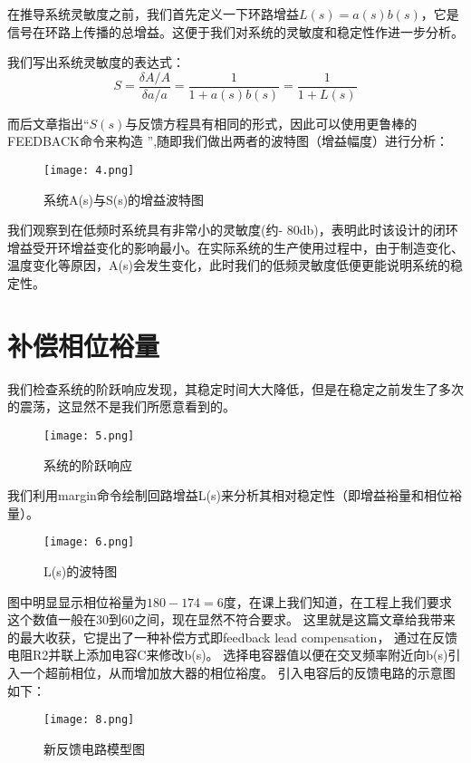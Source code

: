 \documentclass[AutoFakeBold]{LZUThesis}
\begin{document}
在推导系统灵敏度之前，我们首先定义一下环路增益$L(s)=a(s)b(s)$，它是信号在环路上传播的总增益。这便于我们对系统的灵敏度和稳定性作进一步分析。

我们写出系统灵敏度的表达式：
\begin{equation}
    S=\frac{\delta A/A}{\delta a/a}=\frac{1}{1+a(s)b(s)}=\frac{1}{1+L(s)}
\end{equation}

而后文章指出“$S(s)$与反馈方程具有相同的形式，因此可以使用更鲁棒的FEEDBACK命令来构造
”,随即我们做出两者的波特图（增益幅度）进行分析：

\begin{figure}[htbp]
    \centering
    \texttt{[image: 4.png]}
    \caption{系统A(s)与S(s)的增益波特图}
\end{figure}

我们观察到在低频时系统具有非常小的灵敏度(约- 80db)，表明此时该设计的闭环增益受开环增益变化的影响最小。在实际系统的生产使用过程中，由于制造变化、温度变化等原因，A(s)会发生变化，此时我们的低频灵敏度低便更能说明系统的稳定性。

\section{补偿相位裕量}
我们检查系统的阶跃响应发现，其稳定时间大大降低，但是在稳定之前发生了多次的震荡，这显然不是我们所愿意看到的。

\begin{figure}[htbp]
    \centering
    \texttt{[image: 5.png]}
    \caption{系统的阶跃响应}
\end{figure}

我们利用margin命令绘制回路增益L(s)来分析其相对稳定性（即增益裕量和相位裕量）。

\begin{figure}[htbp]
    \centering
    \texttt{[image: 6.png]}
    \caption{L(s)的波特图}
\end{figure}

图中明显显示相位裕量为$180-174=6$度，在课上我们知道，在工程上我们要求这个数值一般在30到60之间，现在显然不符合要求。
这里就是这篇文章给我带来的最大收获，它提出了一种补偿方式即feedback lead compensation，
通过在反馈电阻R2并联上添加电容C来修改b(s)。
选择电容器值以便在交叉频率附近向b(s)引入一个超前相位，从而增加放大器的相位裕度。
引入电容后的反馈电路的示意图如下：
\begin{figure}[htbp]
    \centering
    \texttt{[image: 8.png]}
    \caption{新反馈电路模型图}
\end{figure}
\end{document}
